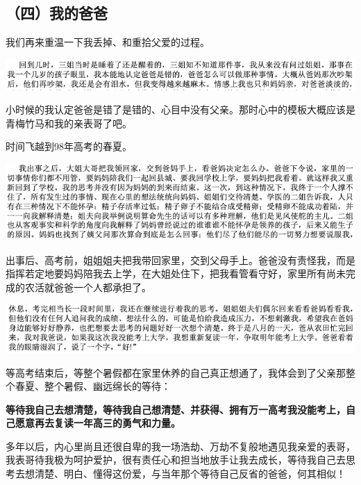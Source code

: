 \documentclass[9pt, b5paper]{article}
\begin{document}
\subsection{（四）我的爸爸}
\label{sec:org9b95699}

我们再来重温一下我丢掉、和重拾父爱的过程。

\begin{center}
\includegraphics[width=.9\linewidth]{./pic/backups_plans_20210422_223112.png}
\end{center}

小时候的我认定爸爸是错了是错的、心目中没有父亲。那时心中的模板大概应该是青梅竹马和我的亲表哥了吧。 

时间飞越到98年高考的春夏。 

\begin{center}
\includegraphics[width=.9\linewidth]{./pic/backups_plans_20210422_174607.png}
\end{center}

出事后、高考前，姐姐姐夫把我带回家里，交到父母手上。爸爸没有责怪我，而是指挥若定地要妈妈陪我去上学，在大姐处住下，把我看管看守好，家里所有尚未完成的农活就爸爸一个人都承担了。 

\begin{center}
\includegraphics[width=.9\linewidth]{./pic/backups_plans_20210422_174532.png}
\end{center}

等高考结束后，等整个暑假都在家里休养的自己真正想通了，我体会到了父亲那整个春夏、整个暑假、幽远绵长的等待：

\textbf{等待我自己去想清楚，等待我自己想清楚、并获得、拥有万一高考我没能考上，自己愿意再去复读一年高三的勇气和力量。}

多年以后，内心里尚且还很自卑的我一场浩劫、万劫不复般地遇见我亲爱的表哥，我表哥待我极为呵护爱护，很有责任心和担当地放手让我去成长，等待我自己去思考去想清楚、明白、懂得这份爱，与当年那个等待自己反省的爸爸，何其相似！
\end{document}
